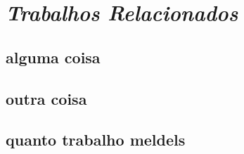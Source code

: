 \chapter{\textit{Trabalhos Relacionados}}
	\label{ch:trabalhos}

\section{alguma coisa}
\section{outra coisa}
\section{quanto trabalho meldels}
